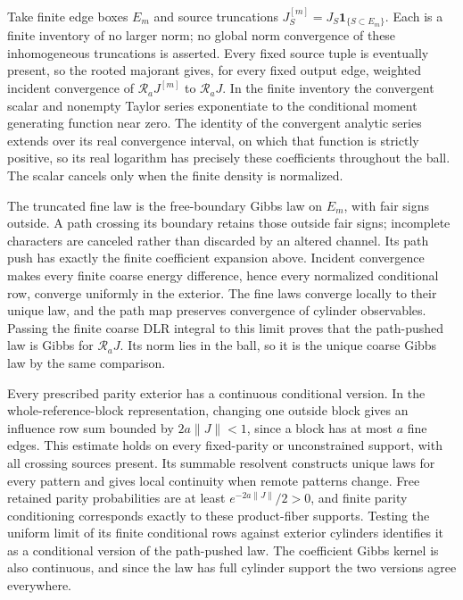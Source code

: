 Take finite edge boxes \(E_m\) and source truncations
\(J^{[m]}_S=J_S\mathbf1_{\{S\subset E_m\}}\). Each is a finite inventory of
no larger norm; no global norm convergence of these inhomogeneous
truncations is asserted. Every fixed source tuple is eventually present, so
the rooted majorant gives, for every fixed output edge, weighted incident
convergence of \(\mathscr R_aJ^{[m]}\) to \(\mathscr R_aJ\). In the finite
inventory the convergent scalar and nonempty Taylor series exponentiate to
the conditional moment generating function near zero. The identity of the
convergent analytic series extends over its real convergence interval, on
which that function is strictly positive, so its real logarithm has
precisely these coefficients throughout the ball. The scalar cancels only
when the finite density is normalized.

The truncated fine law is the free-boundary Gibbs law on \(E_m\), with fair
signs outside. A path crossing its boundary retains those outside fair
signs; incomplete characters are canceled rather than discarded by an
altered channel. Its path push has exactly the finite coefficient expansion
above. Incident convergence makes every finite coarse energy difference,
hence every normalized conditional row, converge uniformly in the exterior.
The fine laws converge locally to their unique law, and the path map
preserves convergence of cylinder observables. Passing the finite coarse
DLR integral to this limit proves that the path-pushed law is Gibbs for
\(\mathscr R_aJ\). Its norm lies in the ball, so it is the unique coarse
Gibbs law by the same comparison.

Every prescribed parity exterior has a continuous conditional version. In
the whole-reference-block representation, changing one outside block gives
an influence row sum bounded by \(2a\|J\|<1\), since a block has at most
\(a\) fine edges. This estimate holds on every fixed-parity or
unconstrained support, with all crossing sources present. Its summable
resolvent constructs unique laws for every pattern and gives local
continuity when remote patterns change. Free retained parity probabilities
are at least \(e^{-2a\|J\|}/2>0\), and finite parity conditioning
corresponds exactly to these product-fiber supports. Testing the uniform
limit of its finite conditional rows against exterior cylinders identifies
it as a conditional version of the path-pushed law. The coefficient Gibbs
kernel is also continuous, and since the law has full cylinder support the
two versions agree everywhere.

